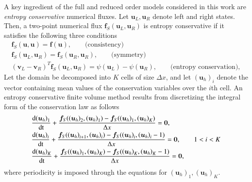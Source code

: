 \documentclass[preprint,10pt]{elsarticle}
\theoremstyle{definition}
\theoremstyle{lemma}
\theoremstyle{theorem}
\theoremstyle{assumption}
\newcommand{\td}[2]{\frac{{\rm d}#1}{{\rm d}{\rm #2}}}
\newcommand{\LRp}[1]{\left( #1 \right)}
\begin{document}
A key ingredient of the full and reduced order models considered in this work are \textit{entropy conservative} numerical fluxes.  Let $\bm{u}_L, \bm{u}_R$ denote left and right states.  Then, a two-point numerical flux $\bm{f}_S(\bm{u}_L, \bm{u}_R)$ is entropy conservative if it satisfies the following three conditions
\begin{gather}
\bm{f}_S(\bm{u},\bm{u}) = \bm{f}(\bm{u}), \qquad \text{(consistency)} \label{eq:esflux}\\
\bm{f}_S(\bm{u}_L,\bm{u}_R) = \bm{f}_S(\bm{u}_R,\bm{u}_R), \qquad \text{(symmetry)} \nonumber\\
\LRp{\bm{v}_L-\bm{v}_R}^T\bm{f}_S(\bm{u}_L,\bm{u}_R) = \psi(\bm{u}_L) - \psi(\bm{u}_R), \qquad \text{(entropy conservation)}\nonumber,
\end{gather}
Let the domain be decomposed into $K$ cells of size $\Delta x$, and let ${\LRp{\bm{u}_h}_i}$ denote the vector containing mean values of the conservation variables over the $i$th cell.  An entropy conservative finite volume method results from discretizing the integral form of the conservation law as follows
\begin{align}
&\td{{\LRp{\bm{u}_h}_1}}{t} + \frac{\bm{f}_S({\LRp{\bm{u}_h}_2},\LRp{\bm{u}_h}_1)-\bm{f}_S({\LRp{\bm{u}_h}_1},{\LRp{\bm{u}_h}_K})}{\Delta x} = \bm{0}, \label{eq:nonlineqs1d}\\
&\td{{\LRp{\bm{u}_h}_i}}{t} + \frac{\bm{f}_S({\LRp{\bm{u}_h}_{i+1}},\LRp{\bm{u}_h}_i)-\bm{f}_S({\LRp{\bm{u}_h}_i},{\LRp{\bm{u}_h}_i-1})}{\Delta x} = \bm{0}, \qquad 1 < i < K \nonumber\\
&\td{{\LRp{\bm{u}_h}_K}}{t} + \frac{\bm{f}_S({\LRp{\bm{u}_h}_1},\LRp{\bm{u}_h}_K)-\bm{f}_S({\LRp{\bm{u}_h}_K},{\LRp{\bm{u}_h}_K-1})}{\Delta x} = \bm{0},\nonumber
\end{align}
where periodicity is imposed through the equations for ${\LRp{\bm{u}_h}_1}, {\LRp{\bm{u}_h}_K}$.  
\end{document}
